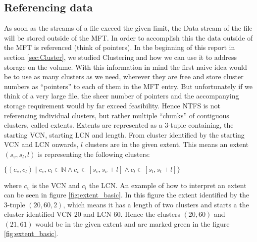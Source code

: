 \subsection{Referencing data}
As soon as the streams of a file exceed the given limit, the Data stream of the file will be stored outside of the MFT. In order to accomplish this the data outside of the MFT is referenced (think of pointers). In the beginning of this report in section \ref{sec:Cluster}, we studied Clustering and how we can use it to address storage on the volume. With this information in mind the first naive idea would be to use as many clusters as we need, wherever they are free and store cluster numbers as ``pointers'' to each of them in the MFT entry. But unfortunately if we think of a very large file, the sheer number of pointers and the accompanying storage requirement would by far exceed feasibility. Hence NTFS is not referencing individual clusters, but rather multiple ``chunks'' of contiguous clusters, called extents. Extents are represented as a 3-tuple containing, the starting VCN, starting LCN and length. From cluster identified by the starting VCN and LCN onwards, $l$ clusters are in the given extent. This means an extent $(s_v, s_l, l)$ is representing the following clusters:
\begin{center}
	$\{(c_v, c_l) \mid c_v, c_l \in \mathbb{N} \wedge c_v \in [s_v, s_v + l] \wedge c_l \in [s_l, s_l + l]\}$
\end{center}
where $c_v$ is the VCN and $c_l$ the LCN.\cite{miller:2013:CNS} An example of how to interpret an extent can be seen in figure \ref{fig:extent_basic}. In this figure the extent identified by the 3-tuple $(20, 60, 2)$, which means it has a length of two clusters and starts a the cluster identified VCN 20 and LCN 60. Hence the clusters $(20, 60)$ and $(21, 61)$ would be in the given extent and are marked green in the figure \ref{fig:extent_basic}.
